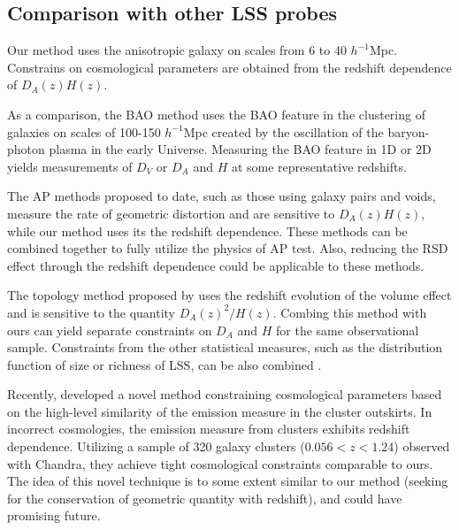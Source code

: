 \documentclass[iop]{emulateapj}
\begin{document}
\subsection{Comparison with other LSS probes}

Our method uses the anisotropic galaxy on scales from 6 to 40 $h^{-1}$Mpc.
Constrains on cosmological parameters are obtained from the redshift dependence of $D_A(z) H(z)$.

As a comparison, the BAO method uses the BAO feature in the 
clustering of galaxies on scales of 100-150 $h^{-1}$Mpc 
created by the oscillation of the baryon-photon plasma in the early Universe.
Measuring the BAO feature in 1D or 2D yields measurements of $D_V$ or $D_A$ and $H$ at some representative redshifts.

The AP methods proposed to date, such as those using 
galaxy pairs and voids, measure the rate of geometric distortion and are sensitive to $D_A(z) H(z)$,
while our method uses its the redshift dependence.
These methods can be combined together to fully utilize the physics of AP test.
Also, reducing the RSD effect 
through the redshift dependence could be 
applicable to these methods.

The topology method proposed by \cite{topology} 
uses the redshift evolution of the volume effect and is sensitive to the quantity $D_A(z)^2 / H(z)$.
Combing this method with ours can yield separate constraints on $D_A$ and $H$ 
for the same observational sample.
Constraints from the other statistical measures,
such as the distribution function of size or richness of LSS,
can be also combined \citep{Park2012,Park2015}.

Recently, \cite{MS2016} developed a novel method 
constraining cosmological parameters based on the high-level similarity of the emission measure in the cluster outskirts.
In incorrect cosmologies, the emission measure from clusters exhibits redshift dependence.
Utilizing a sample of 320 galaxy clusters ($0.056<z<1.24$) observed with Chandra,
they achieve tight cosmological constraints comparable to ours.
The idea of this novel technique is to some extent similar to our method 
(seeking for the conservation of geometric quantity with redshift),
and could have promising future.
\end{document}
